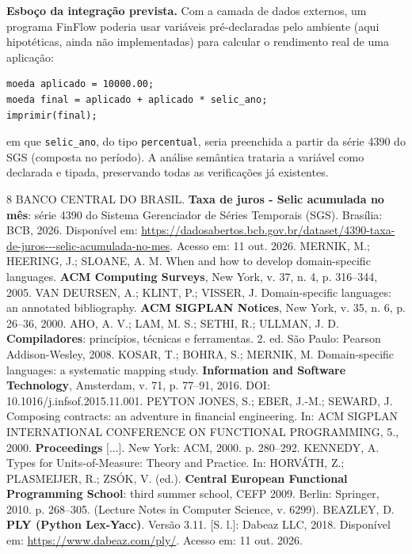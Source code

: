 \documentclass[conference]{IEEEtran}
\begin{document}
\textbf{Esboço da integração prevista.} Com a camada de dados externos, um programa FinFlow poderia usar variáveis pré-declaradas pelo ambiente (aqui hipotéticas, ainda não implementadas) para calcular o rendimento real de uma aplicação:
\begin{minipage}{\columnwidth}\begin{lstlisting}
moeda aplicado = 10000.00;
moeda final = aplicado + aplicado * selic_ano;
imprimir(final);
\end{lstlisting}\end{minipage}\par\smallskip
em que \texttt{selic\_ano}, do tipo \texttt{percentual}, seria preenchida a partir da série 4390 do SGS (composta no período). A análise semântica trataria a variável como declarada e tipada, preservando todas as verificações já existentes.

\begin{thebibliography}{8}
 BANCO CENTRAL DO BRASIL. \textbf{Taxa de juros - Selic acumulada no mês}: série 4390 do Sistema Gerenciador de Séries Temporais (SGS). Brasília: BCB, 2026. Disponível em: \url{https://dadosabertos.bcb.gov.br/dataset/4390-taxa-de-juros---selic-acumulada-no-mes}. Acesso em: 11 out. 2026.
 MERNIK, M.; HEERING, J.; SLOANE, A. M. When and how to develop domain-specific languages. \textbf{ACM Computing Surveys}, New York, v. 37, n. 4, p. 316--344, 2005.
 VAN DEURSEN, A.; KLINT, P.; VISSER, J. Domain-specific languages: an annotated bibliography. \textbf{ACM SIGPLAN Notices}, New York, v. 35, n. 6, p. 26--36, 2000.
 AHO, A. V.; LAM, M. S.; SETHI, R.; ULLMAN, J. D. \textbf{Compiladores}: princípios, técnicas e ferramentas. 2. ed. São Paulo: Pearson Addison-Wesley, 2008.
 KOSAR, T.; BOHRA, S.; MERNIK, M. Domain-specific languages: a systematic mapping study. \textbf{Information and Software Technology}, Amsterdam, v. 71, p. 77--91, 2016. DOI: 10.1016/j.infsof.2015.11.001.
 PEYTON JONES, S.; EBER, J.-M.; SEWARD, J. Composing contracts: an adventure in financial engineering. In: ACM SIGPLAN INTERNATIONAL CONFERENCE ON FUNCTIONAL PROGRAMMING, 5., 2000. \textbf{Proceedings} [...]. New York: ACM, 2000. p. 280--292.
 KENNEDY, A. Types for Units-of-Measure: Theory and Practice. In: HORVÁTH, Z.; PLASMEIJER, R.; ZSÓK, V. (ed.). \textbf{Central European Functional Programming School}: third summer school, CEFP 2009. Berlin: Springer, 2010. p. 268--305. (Lecture Notes in Computer Science, v. 6299).
 BEAZLEY, D. \textbf{PLY (Python Lex-Yacc)}. Versão 3.11. [S. l.]: Dabeaz LLC, 2018. Disponível em: \url{https://www.dabeaz.com/ply/}. Acesso em: 11 out. 2026.
\end{thebibliography}
\end{document}
